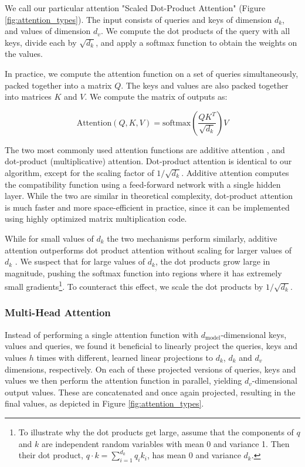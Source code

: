 \documentclass[12pt, a4paper]{article}
\begin{document}
We call our particular attention "Scaled Dot-Product Attention" (Figure \ref{fig:attention_types}). The input consists of queries and keys of dimension $d_k$, and values of dimension $d_v$. We compute the dot products of the query with all keys, divide each by $\sqrt{d_k}$, and apply a softmax function to obtain the weights on the values.

In practice, we compute the attention function on a set of queries simultaneously, packed together into a matrix $Q$. The keys and values are also packed together into matrices $K$ and $V$. We compute the matrix of outputs as:

\begin{equation}
\text{Attention}( Q, K, V ) = \text{softmax}\left( \frac{QK^T}{\sqrt{d_k}} \right) V
\label{eq:attention}
\end{equation}

The two most commonly used attention functions are additive attention \cite{2}, and dot-product (multiplicative) attention. Dot-product attention is identical to our algorithm, except for the scaling factor of $1/\sqrt{d_k}$. Additive attention computes the compatibility function using a feed-forward network with a single hidden layer. While the two are similar in theoretical complexity, dot-product attention is much faster and more space-efficient in practice, since it can be implemented using highly optimized matrix multiplication code.

While for small values of $d_k$ the two mechanisms perform similarly, additive attention outperforms dot product attention without scaling for larger values of $d_k$ \cite{3}. We suspect that for large values of $d_k$, the dot products grow large in magnitude, pushing the softmax function into regions where it has extremely small gradients\footnote{To illustrate why the dot products get large, assume that the components of $q$ and $k$ are independent random variables with mean 0 and variance 1. Then their dot product, $q \cdot k = \sum_{i=1}^{d_k} q_i k_i$, has mean 0 and variance $d_k$.}. To counteract this effect, we scale the dot products by $1/\sqrt{d_k}$.

\subsubsection{Multi-Head Attention}

Instead of performing a single attention function with $d_{\text{model}}$-dimensional keys, values and queries, we found it beneficial to linearly project the queries, keys and values $h$ times with different, learned linear projections to $d_k$, $d_k$ and $d_v$ dimensions, respectively. On each of these projected versions of queries, keys and values we then perform the attention function in parallel, yielding $d_v$-dimensional output values. These are concatenated and once again projected, resulting in the final values, as depicted in Figure \ref{fig:attention_types}.
\end{document}
